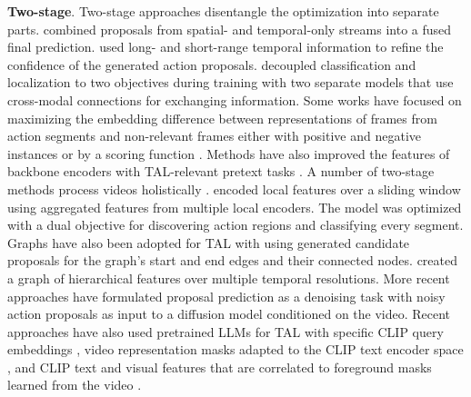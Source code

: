 \noindent
\textbf{Two-stage}. Two-stage approaches disentangle the optimization into separate parts. \citet{zhai2020two} combined proposals from spatial- and temporal-only streams into a fused final prediction. \citet{chen2022dcan} used long- and short-range temporal information to refine the confidence of the generated action proposals. \citet{huang2019decoupling} decoupled classification and localization to two objectives during training with two separate models that use cross-modal connections for exchanging information. Some works have focused on maximizing the embedding difference between representations of frames from action segments and non-relevant frames either with positive and negative instances \citep{luo2020weakly,zhang2021cola} or by a scoring function \citep{rizve2023pivotal}. Methods have also improved the features of backbone encoders with TAL-relevant pretext tasks \citep{zhang2022unsupervised}. A number of two-stage methods process videos holistically \citep{alwassel2021tsp,he2022asm,liu2021weakly,qing2021temporal}. \citet{alwassel2021tsp} encoded local features over a sliding window using aggregated features from multiple local encoders. The model was optimized with a dual objective for discovering action regions and classifying every segment. Graphs have also been adopted for TAL with \citet{bai2020boundary} using generated candidate proposals for the graph's start and end edges and their connected nodes. \citet{zhao2021video} created a graph of hierarchical features over multiple temporal resolutions. More recent approaches \citep{nag2023difftad} have formulated proposal prediction as a denoising task with noisy action proposals as input to a diffusion model conditioned on the video. Recent approaches have also used pretrained LLMs for TAL with specific CLIP query embeddings \citep{ju2022prompting}, video representation masks adapted to the CLIP text encoder space \citep{nag2022zero}, and CLIP text and visual features that are correlated to foreground masks learned from the video \citep{phan2024zeetad}.

